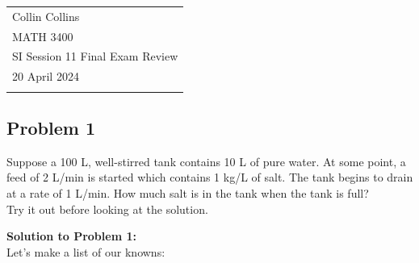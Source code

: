 \documentclass[a4paper,12pt]{article}
\begin{document}
\thispagestyle{empty} 

\begin{tabular}{p{15.5cm}} 
\\ Collin Collins \\
MATH 3400\\
SI Session 11 Final Exam Review\\
20 April 2024 \\
\hline 
\\
\end{tabular}


\subsection*{Problem 1} Suppose a 100 L, well-stirred tank contains 10 L of pure water. At some point, a feed of 2 L/min is started which contains 1 kg/L of salt. The tank begins to drain at a rate of 1 L/min. How much salt is in the tank when the tank is full?
\\
 
Try it out before looking at the solution.
\pagebreak

\textbf{Solution to Problem 1:}\\
Let's make a list of our knowns:
\end{document}
